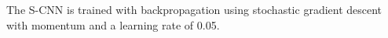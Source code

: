 \documentclass[10pt,twocolumn,letterpaper]{article}
\begin{document}

The S-CNN is trained with backpropagation using stochastic gradient descent with momentum and a learning rate of 0.05. 

\end{document}
